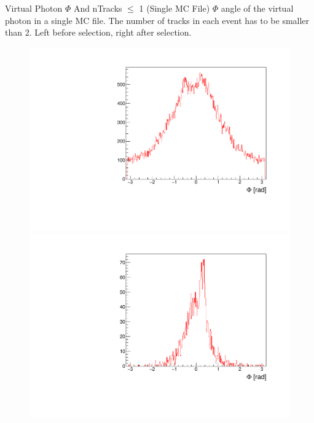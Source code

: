 \documentclass[10pt]{beamer}
\begin{document}
\begin{frame}{Virtual Photon $\Phi$ And nTracks $\leq$ 1 (Single MC File)}
	$\Phi$ angle of the virtual photon in a single MC file. The number of tracks in each event has to be smaller than 2. Left before selection, right after selection.
	
	\begin{figure}
		\centering
		\begin{minipage}{.5\textwidth}
			\centering
			\includegraphics[width=\textwidth]{gg/Phigg_BS_nT1}
			
		\end{minipage}%
		\begin{minipage}{.5\textwidth}
			\centering
			\includegraphics[width=\textwidth]{gg/Phigg_AS_nT1}
			
		\end{minipage}
	\end{figure}



\end{frame}
\end{document}
